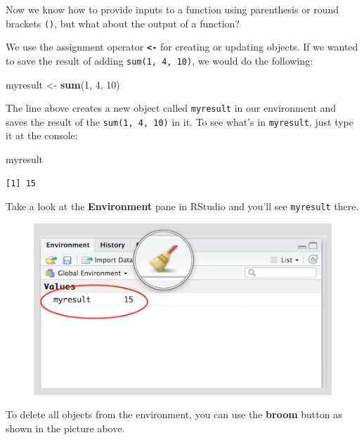 \documentclass[]{book}
\newenvironment{Shaded}{\begin{snugshade}}{\end{snugshade}}
\newcommand{\KeywordTok}[1]{\textcolor[rgb]{0.13,0.29,0.53}{\textbf{#1}}}
\newcommand{\DecValTok}[1]{\textcolor[rgb]{0.00,0.00,0.81}{#1}}
\newcommand{\StringTok}[1]{\textcolor[rgb]{0.31,0.60,0.02}{#1}}
\newcommand{\NormalTok}[1]{#1}
\theoremstyle{definition}
\theoremstyle{definition}
\theoremstyle{definition}
\theoremstyle{remark}
\begin{document}
Now we know how to provide inputs to a function using parenthesis or
round brackets \texttt{()}, but what about the output of a function?

We use the assignment operator \textbf{\texttt{\textless{}-}} for
creating or updating objects. If we wanted to save the result of adding
\texttt{sum(1,\ 4,\ 10)}, we would do the following:

\begin{Shaded}
\begin{Highlighting}[]
\NormalTok{myresult <-}\StringTok{ }\KeywordTok{sum}\NormalTok{(}\DecValTok{1}\NormalTok{, }\DecValTok{4}\NormalTok{, }\DecValTok{10}\NormalTok{)}
\end{Highlighting}
\end{Shaded}

The line above creates a new object called \texttt{myresult} in our
environment and saves the result of the \texttt{sum(1,\ 4,\ 10)} in it.
To see what's in \texttt{myresult}, just type it at the console:

\begin{Shaded}
\begin{Highlighting}[]
\NormalTok{myresult}
\end{Highlighting}
\end{Shaded}

\begin{verbatim}
[1] 15
\end{verbatim}

Take a look at the \textbf{Environment} pane in RStudio and you'll see
\texttt{myresult} there.

\begin{figure}
\centering
\includegraphics{./img/rstudio_env.png}
\caption{}
\end{figure}

To delete all objects from the environment, you can use the
\textbf{broom} button as shown in the picture above.
\end{document}
